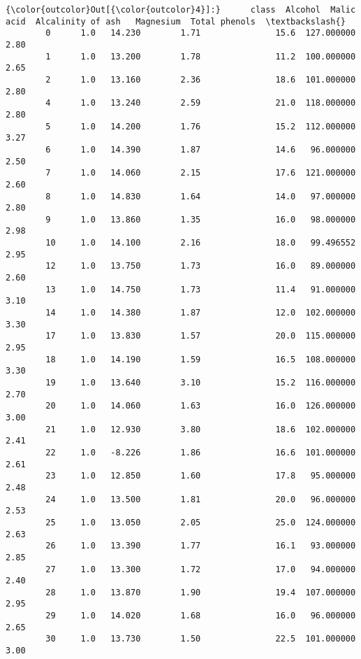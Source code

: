 \documentclass[11pt]{article}
\begin{document}
\begin{Verbatim}[commandchars=\\\{\}]
{\color{outcolor}Out[{\color{outcolor}4}]:}      class  Alcohol  Malic acid  Alcalinity of ash   Magnesium  Total phenols  \textbackslash{}
        0      1.0   14.230        1.71               15.6  127.000000           2.80   
        1      1.0   13.200        1.78               11.2  100.000000           2.65   
        2      1.0   13.160        2.36               18.6  101.000000           2.80   
        4      1.0   13.240        2.59               21.0  118.000000           2.80   
        5      1.0   14.200        1.76               15.2  112.000000           3.27   
        6      1.0   14.390        1.87               14.6   96.000000           2.50   
        7      1.0   14.060        2.15               17.6  121.000000           2.60   
        8      1.0   14.830        1.64               14.0   97.000000           2.80   
        9      1.0   13.860        1.35               16.0   98.000000           2.98   
        10     1.0   14.100        2.16               18.0   99.496552           2.95   
        12     1.0   13.750        1.73               16.0   89.000000           2.60   
        13     1.0   14.750        1.73               11.4   91.000000           3.10   
        14     1.0   14.380        1.87               12.0  102.000000           3.30   
        17     1.0   13.830        1.57               20.0  115.000000           2.95   
        18     1.0   14.190        1.59               16.5  108.000000           3.30   
        19     1.0   13.640        3.10               15.2  116.000000           2.70   
        20     1.0   14.060        1.63               16.0  126.000000           3.00   
        21     1.0   12.930        3.80               18.6  102.000000           2.41   
        22     1.0   -8.226        1.86               16.6  101.000000           2.61   
        23     1.0   12.850        1.60               17.8   95.000000           2.48   
        24     1.0   13.500        1.81               20.0   96.000000           2.53   
        25     1.0   13.050        2.05               25.0  124.000000           2.63   
        26     1.0   13.390        1.77               16.1   93.000000           2.85   
        27     1.0   13.300        1.72               17.0   94.000000           2.40   
        28     1.0   13.870        1.90               19.4  107.000000           2.95   
        29     1.0   14.020        1.68               16.0   96.000000           2.65   
        30     1.0   13.730        1.50               22.5  101.000000           3.00   

\end{Verbatim}
\end{document}

